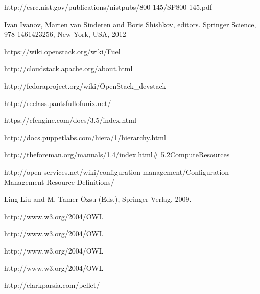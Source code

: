 


\newblock http://csrc.nist.gov/publications/nistpubs/800-145/SP800-145.pdf

Ivan Ivanov, Marten van Sinderen and Boris Shishkov, editors.
\newblock Springer Science, 978-1461423256, New York, USA, 2012

\newblock https://wiki.openstack.org/wiki/Fuel

\newblock http://cloudstack.apache.org/about.html

\newblock http://fedoraproject.org/wiki/OpenStack\_devstack

\newblock http://reclass.pantsfullofunix.net/

\newblock https://cfengine.com/docs/3.5/index.html

\newblock http://docs.puppetlabs.com/hiera/1/hierarchy.html

\newblock http://theforeman.org/manuals/1.4/index.html\# 5.2ComputeResources

\newblock http://open-services.net/wiki/configuration-management/Configuration-Management-Resource-Definitions/


\newblock Ling Liu and M. Tamer Özsu (Eds.), Springer-Verlag, 2009.

\newblock http://www.w3.org/2004/OWL

\newblock http://www.w3.org/2004/OWL

\newblock http://www.w3.org/2004/OWL


\newblock http://www.w3.org/2004/OWL

\newblock http://clarkparsia.com/pellet/
